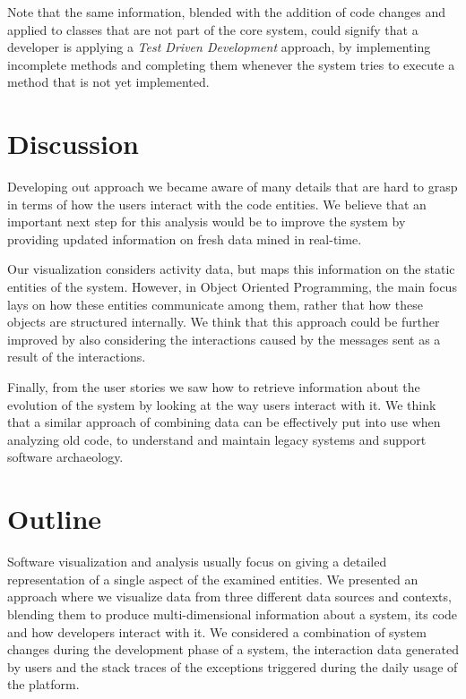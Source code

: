 Note that the same information, blended with the addition of code changes and applied to classes that are not part of the core system, could signify that a developer is applying a \textit{Test Driven Development} approach, by implementing incomplete methods and completing them whenever the system tries to execute a method that is not yet implemented.


\section{Discussion}\label{sec:blend-discussion}

Developing out approach we became aware of many details that are hard to grasp in terms of how the users interact with the code entities.
We believe that an important next step for this analysis would be to improve the system by providing updated information on fresh data mined in real-time.

Our visualization considers activity data, but maps this information on the static entities of the system.
However, in Object Oriented Programming, the main focus lays on how these entities communicate among them, rather that how these objects are structured internally.
We think that this approach could be further improved by also considering the interactions caused by the messages sent as a result of the interactions.

Finally, from the user stories we saw how to retrieve information about the evolution of the system by looking at the way users interact with it.
We think that a similar approach of combining data can be effectively put into use when analyzing old code, to understand and maintain legacy systems and support software archaeology.



\section{Outline}\label{sec:blend-summary}

Software visualization and analysis usually focus on giving a detailed representation of a single aspect of the examined entities.
We presented an approach where we visualize data from three different data sources and contexts, blending them to produce multi-dimensional information about a system, its code and how developers interact with it.
We considered a combination of system changes during the development phase of a system, the interaction data generated by users and the stack traces of the exceptions triggered during the daily usage of the platform.

